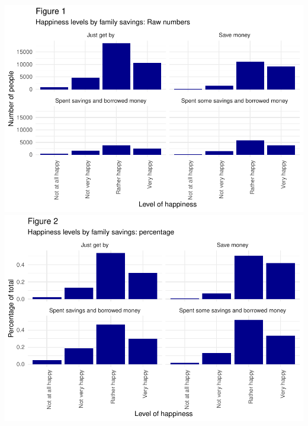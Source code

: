 \documentclass[man,floatsintext]{apa6}
\begin{document}
\includegraphics{610_final_files/figure-latex/happiness and family savings JW-1.pdf} \includegraphics{610_final_files/figure-latex/happiness and family savings JW-2.pdf}
\end{document}
